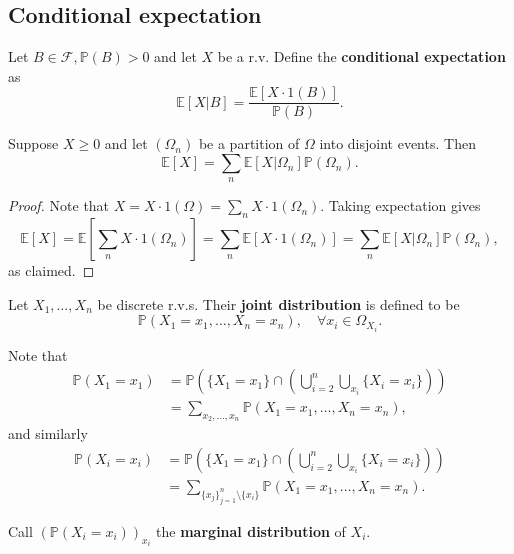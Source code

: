 \subsection{Conditional expectation}
\begin{definition}
    Let $B\in \mathscr{F},\mathbb{P}(B)>0$ and let $ X $ be a r.v. Define the \textbf{conditional expectation} as
    \[
        \mathbb{E}[X|B] = \frac{\mathbb{E}[X\cdot 1(B)]}{\mathbb{P}(B)}.
    \]
\end{definition}
\begin{proposition}\label{prop:Law of total expectation}
    Suppose $X\ge 0$ and let $ (\Omega_n) $ be a partition of $\Omega$ into disjoint events. Then 
    \[
        \mathbb{E}[X] = \sum_{n} \mathbb{E}[X|\Omega_n]\mathbb{P}(\Omega_n).
    \]
\end{proposition}
\begin{proof}
    Note that $ X=X \cdot 1(\Omega)=\sum_{n} X \cdot 1(\Omega_n) $. Taking expectation gives
    \[
    \mathbb{E}[X] = \mathbb{E}\left[ \sum_{n} X \cdot 1(\Omega_n) \right] = \sum_{n}\mathbb{E}[X\cdot 1(\Omega_n)]=\sum_{n} \mathbb{E}[X|\Omega_n]\mathbb{P}(\Omega_n),
    \]
    as claimed.
\end{proof}

\begin{definition}
    Let $ X_1,\dots,X_n $ be discrete r.v.s. Their \textbf{joint distribution} is defined to be 
    \[
        \mathbb{P}(X_1=x_1,\dots,X_n=x_n), \quad \forall x_i\in \Omega_{X_i}.
    \]
\end{definition}

Note that 
\begin{align*}
    \mathbb{P}(X_1=x_1) &= \mathbb{P}\left( \{X_1=x_1\} \cap \left( \bigcup_{i=2}^{n} \bigcup_{x_i} \{X_i=x_i\} \right) \right)\\ 
    &= \sum_{x_2,\dots,x_n} \mathbb{P}(X_1=x_1,\dots,X_n=x_n),
\end{align*}
and similarly 
\begin{align*}
    \mathbb{P}(X_i=x_i) &= \mathbb{P}\left( \{X_1=x_1\} \cap \left( \bigcup_{i=2}^{n} \bigcup_{x_i} \{X_i=x_i\} \right) \right)\\ 
    &= \sum_{\{x_j\}_{j=1}^n\setminus\{x_i\}} \mathbb{P}(X_1=x_1,\dots,X_n=x_n).
\end{align*}
\begin{definition}
    Call $ (\mathbb{P}(X_i=x_i) )_{x_i}$ the \textbf{marginal distribution} of $X_i$.
\end{definition}

